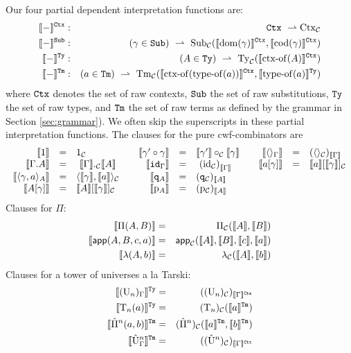 \documentclass{lmcs}
\def\UU{\mathrm{U}}
\def\Ta{\mathrm{T}}
\def\Pihat{\hat{\Pi}}
\def\UUhat{\hat{\UU}}
\newcommand{\intCtxU}[1]{\llbracket #1 \rrbracket^\RawCtx}
\newcommand{\intSubU}[1]{\llbracket #1 \rrbracket^\RawSub}
\newcommand{\intTyU}[1]{\llbracket #1 \rrbracket^\RawTy}
\newcommand{\intTmU}[1]{\llbracket #1 \rrbracket^\RawTm}
\begin{document}
Our four partial dependent interpretation functions are:
\begin{eqnarray*}
\intCtxU{-} &:& \RawCtx\ \rightharpoonup \Ctx_\C\\
\intSubU{-}&:& (\gamma \in \RawSub)\ \rightharpoonup \
\Sub_\C(\intCtxU{\domain(\gamma)}, \intCtxU{\codomain(\gamma)})\\
\intTyU{-}&:& (A \in \RawTy)\ \rightharpoonup\ \Ty_\C(\intCtxU{\ctxof(A)})\\
\intTmU{-}&:& (a \in\RawTm)\ \rightharpoonup\
\Tm_\C (\intCtxU{\ctxof(\typeof(a))}, \intTyU{\typeof(a)})
\end{eqnarray*}
where ${\tt Ctx}$ denotes the set of raw contexts, ${\tt Sub}$ the set of raw substitutions, ${\tt Ty}$ the set of raw types, and ${\tt Tm}$ the set of raw terms as defined by the grammar in Section \ref{sec:grammar}). 
We often skip the superscripts in these partial interpretation functions. The clauses for the pure cwf-combinators are
\[
\begin{array}{rclcrclcrcl}
\llbracket 1 \rrbracket &=& 1_{\mathcal C} 						&&
\llbracket \gamma' \circ \gamma \rrbracket &= & \llbracket \gamma' \rrbracket \circ_{\mathcal C} \llbracket \gamma \rrbracket&&
\llbracket  \langle  \rangle_ \Gamma   \rrbracket &=&  (\langle  \rangle_{\mathcal C}) _{ \llbracket \Gamma \rrbracket  }
\\
\llbracket  \Gamma .A \rrbracket &=& \ \llbracket \Gamma \rrbracket ._{\mathcal C} \llbracket A \rrbracket	&&
\llbracket {\tt id}_{\Gamma} \rrbracket & = &\ {(\mathrm{id}_{\mathcal C})}_{\llbracket \Gamma \rrbracket}	&&
\llbracket a[\gamma] \rrbracket &=& \llbracket a \rrbracket[\llbracket \gamma \rrbracket]_{\mathcal C}
\\
\llbracket  \langle  \gamma , a \rangle_A  \rrbracket &=& \langle \llbracket \gamma \rrbracket , \llbracket a \rrbracket \rangle_{\mathcal C}&&
\llbracket {\tt q}_A \rrbracket &= & ({\tt q}_{\mathcal C})_{\llbracket A \rrbracket}
\\
\llbracket A[\gamma] \rrbracket &=& \llbracket A \rrbracket [\llbracket \gamma \rrbracket]_{\mathcal C}		&&
\llbracket \mathrm{p}_A \rrbracket &= & (\mathrm{p}_{\mathcal C})_{\llbracket A \rrbracket} 
\end{array}
\]
Clauses for $\Pi$:
\begin{eqnarray*}
\llbracket \Pi(A,B) \rrbracket &=& \Pi_{\mathcal C}(\llbracket A \rrbracket,\llbracket B \rrbracket)\\
\llbracket \mathsf{app}(A,B,c,a) \rrbracket &=& \mathsf{app}_{\mathcal C}(\llbracket A \rrbracket,\llbracket B \rrbracket,\llbracket c \rrbracket,\llbracket a \rrbracket)\\
\llbracket \lambda(A,b) \rrbracket &=& \lambda_{\mathcal C}(\llbracket A \rrbracket,\llbracket b \rrbracket)
\end{eqnarray*}
Clauses for a tower of universes a la Tarski:
\begin{eqnarray*}
\intTyU{(\UU_n)_\Gamma} &=& ((\UU_n)_\C)_{\intCtxU{\Gamma}}\\
\intTyU{\Ta_n(a)} &=& (\Ta_n)_\C(\intTmU{a})\\
\intTmU{\Pihat^n(a,b)}&=& (\Pihat^n)_\C(\intTmU{a},\intTmU{b})\\
\intTmU{\UUhat^n_\Gamma}&=& ((\UUhat^n)_\C)_{\intCtxU{\Gamma}}
\end{eqnarray*}
\end{document}
